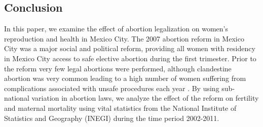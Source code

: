 \documentclass[a4paper, 11pt]{article}
\begin{document}
\begin{spacing}{2}
 
 
\section{Conclusion}\label{Conclusion}
In this paper, we examine the effect of abortion legalization on women's reproduction and health in Mexico City. The 2007 abortion reform in Mexico City was a major social and political reform, providing all women with residency in Mexico City access to safe elective abortion during the first trimester. Prior to the reform very few legal abortions were performed, although clandestine abortion was very common \citep{Becker} leading to a high number of women suffering from complications associated with unsafe procedures each year \citep{GIRE2009}. By using sub-national variation in abortion laws, we analyze the effect of the reform on fertility and maternal mortality using vital statistics from the National Institute of Statistics and Geography (INEGI) during the time period 2002-2011. 


\end{spacing}
\end{document}
